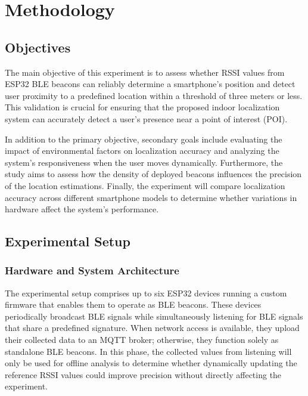 \chapter{Methodology}
\label{chap:methodology}

\section{Objectives}

The main objective of this experiment is to assess whether RSSI values from ESP32 BLE beacons can reliably determine a smartphone’s position and detect user proximity to a predefined location within a threshold of three meters or less. This validation is crucial for ensuring that the proposed indoor localization system can accurately detect a user's presence near a point of interest (POI).

In addition to the primary objective, secondary goals include evaluating the impact of environmental factors on localization accuracy and analyzing the system’s responsiveness when the user moves dynamically. Furthermore, the study aims to assess how the density of deployed beacons influences the precision of the location estimations. Finally, the experiment will compare localization accuracy across different smartphone models to determine whether variations in hardware affect the system’s performance.

\section{Experimental Setup}

\subsection{Hardware and System Architecture}

The experimental setup comprises up to six ESP32 devices running a custom firmware that enables them to operate as BLE beacons. These devices periodically broadcast BLE signals while simultaneously listening for BLE signals that share a predefined signature. When network access is available, they upload their collected data to an MQTT broker; otherwise, they function solely as standalone BLE beacons. In this phase, the collected values from listening will only be used for offline analysis to determine whether dynamically updating the reference RSSI values could improve precision without directly affecting the experiment.


